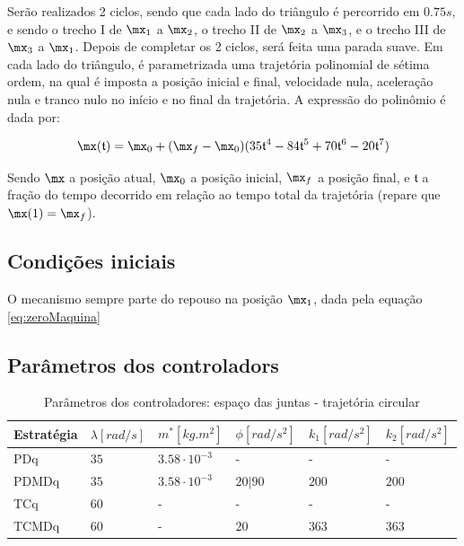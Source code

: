 \documentclass[]{politex}
\begin{document}
Serão realizados 2 ciclos, sendo que cada lado do triângulo é percorrido em $0.75s$, e sendo o trecho I de $\mx_1$ a $\mx_2$, o trecho II de $\mx_2$ a $\mx_3$, e o trecho III de $\mx_3$ a $\mx_1$. Depois de completar os 2 ciclos, será feita uma parada suave. Em cada lado do triângulo, é parametrizada uma trajetória polinomial de sétima ordem, na qual é imposta a posição inicial e final, velocidade nula, aceleração nula e tranco nulo no início e no final da trajetória. A expressão do polinômio é dada por:

\begin{equation}
\mx(\mathfrak{t}) = \mx_0 + (\mx_f - \mx_0) (35 \mathfrak{t}^4 - 84 \mathfrak{t}^5 + 70 \mathfrak{t}^6 - 20 \mathfrak{t}^7)
\end{equation}

Sendo $\mx$ a posição atual, $\mx_0$ a posição inicial, $\mx_f$ a posição final, e $\mathfrak{t}$ a fração do tempo decorrido em relação ao tempo total da trajetória (repare que $\mx(1) = \mx_f$).

\subsection{Condições iniciais}

O mecanismo sempre parte do repouso na posição $\mx_1$, dada pela equação \eqref{eq:zeroMaquina}

\subsection{Parâmetros dos controladors}

\begin{table}[H] 
\centering
\caption{Parâmetros dos controladores: espaço das juntas - trajetória circular}
\label{tab:parametrosControleAtuadoresCirculo}
\begin{tabular}{l|l|l|l|l|l}
Estratégia & $\lambda [rad/s]$  & $m^*[kg.m^2]$ & $\phi[rad/s^2]$   & $k_1[rad/s^2]$ & $k_2[rad/s^2]$ \\ \hline
PDq        & $35$               & $3.58 \cdot 10^{-3}$  & -         & -              & -              \\
PDMDq      & $35$               & $3.58 \cdot 10^{-3}$  & $20 | 90$ & $200$          & $200$          \\
TCq        & $60$               & -                     & -         & -              & -              \\
TCMDq      & $60$               & -                     & $20$      & $363$          & $363$          \\
\end{tabular}
\end{table}
\end{document}
